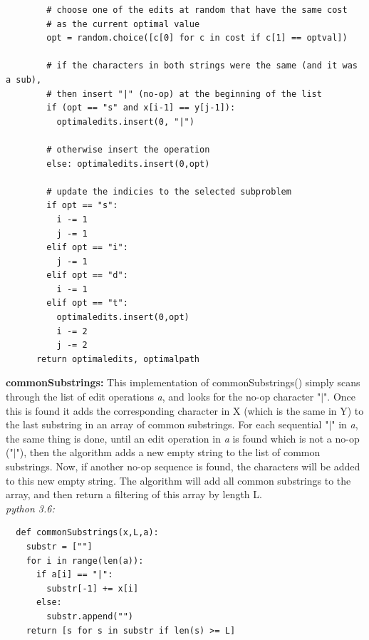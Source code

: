 \documentclass[11pt]{article} \setlength{\oddsidemargin}{0in}
\begin{document}
{\begin{enumerate}
\begin{verbatim}
        # choose one of the edits at random that have the same cost 
        # as the current optimal value 
        opt = random.choice([c[0] for c in cost if c[1] == optval])
        
        # if the characters in both strings were the same (and it was a sub),
        # then insert "|" (no-op) at the beginning of the list
        if (opt == "s" and x[i-1] == y[j-1]):
          optimaledits.insert(0, "|")

        # otherwise insert the operation 
        else: optimaledits.insert(0,opt)
        
        # update the indicies to the selected subproblem
        if opt == "s":
          i -= 1
          j -= 1
        elif opt == "i":
          j -= 1
        elif opt == "d":
          i -= 1
        elif opt == "t":
          optimaledits.insert(0,opt)
          i -= 2
          j -= 2
      return optimaledits, optimalpath
  \end{verbatim}

  \textbf{commonSubstrings:}
  This implementation of commonSubstrings() simply scans through the list of edit operations \textit{a}, and looks for the no-op character "$\vert$". Once this is found it adds the corresponding character in X (which is the same in Y) to the last substring in an array of common substrings. For each sequential "$\vert$" in \textit{a}, the same thing is done, until an edit operation in \textit{a} is found which is not a no-op ("$\vert$"), then the algorithm adds a new empty string to the list of common substrings. Now, if another no-op sequence is found, the characters will be added to this new empty string. The algorithm will add all common substrings to the array, and then return a filtering of this array by length L. \\
  \textit{python 3.6:}
  \begin{verbatim}
  def commonSubstrings(x,L,a):
    substr = [""]
    for i in range(len(a)):
      if a[i] == "|":
        substr[-1] += x[i]
      else: 
        substr.append("")
    return [s for s in substr if len(s) >= L]
  \end{verbatim}

  \pagebreak


\end{enumerate}}
\end{document}

